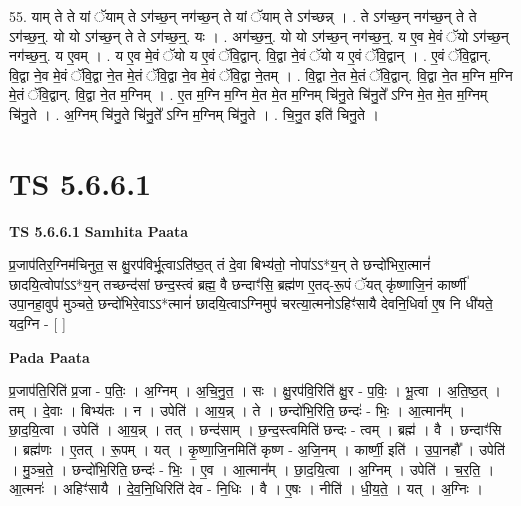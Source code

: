 \documentclass[17pt]{extarticle}
\begin{document}
55. याम् ते ते यां ॅयाम् ते ऽग॑च्छ॒न् नग॑च्छ॒न् ते यां ॅयाम् ते ऽग॑च्छन्न् । . ते ऽग॑च्छ॒न् नग॑च्छ॒न् ते ते ऽग॑च्छ॒न्॒. यो यो ऽग॑च्छ॒न् ते ते ऽग॑च्छ॒न्॒. यः । . अग॑च्छ॒न्॒. यो यो ऽग॑च्छ॒न् नग॑च्छ॒न्॒. य ए॒व मे॒वं ॅयो ऽग॑च्छ॒न् नग॑च्छ॒न्॒. य ए॒वम् । . य ए॒व मे॒वं ॅयो य ए॒वं ॅवि॒द्वान्. वि॒द्वा ने॒वं ॅयो य ए॒वं ॅवि॒द्वान् । . ए॒वं ॅवि॒द्वान्. वि॒द्वा ने॒व मे॒वं ॅवि॒द्वा ने॒त मे॒तं ॅवि॒द्वा ने॒व मे॒वं ॅवि॒द्वा ने॒तम् । . वि॒द्वा ने॒त मे॒तं ॅवि॒द्वान्. वि॒द्वा ने॒त म॒ग्नि म॒ग्नि मे॒तं ॅवि॒द्वान्. वि॒द्वा ने॒त म॒ग्निम् । . ए॒त म॒ग्नि म॒ग्नि मे॒त मे॒त म॒ग्निम् चि॑नु॒ते चि॑नु॒ते᳚ ऽग्नि मे॒त मे॒त म॒ग्निम् चि॑नु॒ते । . अ॒ग्निम् चि॑नु॒ते चि॑नु॒ते᳚ ऽग्नि म॒ग्निम् चि॑नु॒ते । . चि॒नु॒त इति॑ चिनु॒ते । \newline
\pagebreak
{}

\section{ TS 5.6.6.1 }

\textbf{TS 5.6.6.1 } \newline
\textbf{Samhita Paata} \newline

प्र॒जाप॑तिर॒ग्निम॑चिनुत॒ स क्षु॒रप॑विर्भू॒त्वाऽति॑ष्ठ॒त् तं दे॒वा बिभ्य॑तो॒ नोपा॑ऽऽ*य॒न् ते छन्दो॑भिरा॒त्मानं॑ छादयि॒त्वोपा॑ऽऽ*य॒न् तच्छन्द॑सां छन्द॒स्त्वं ब्रह्म॒ वै छन्दाꣳ॑सि॒ ब्रह्म॑ण ए॒तद्-रू॒पं ॅयत् कृ॑ष्णाजि॒नं कार्ष्णी॑ उपा॒नहा॒वुप॑ मुञ्चते॒ छन्दो॑भिरे॒वाऽऽ*त्मानं॑ छादयि॒त्वाऽग्निमुप॑ चरत्या॒त्मनोऽहिꣳ॑सायै देवनि॒धिर्वा ए॒ष नि धी॑यते॒ यद॒ग्नि - [  ] \newline

\textbf{Pada Paata} \newline

प्र॒जाप॑ति॒रिति॑ प्र॒जा - प॒तिः॒ । अ॒ग्निम् । अ॒चि॒नु॒त॒ । सः । क्षु॒रप॑वि॒रिति॑ क्षु॒र - प॒विः॒ । भू॒त्वा । अ॒ति॒ष्ठ॒त् । तम् । दे॒वाः । बिभ्य॑तः । न । उपेति॑ । आ॒य॒न्न् । ते । छन्दो॑भि॒रिति॒ छन्दः॑ - भिः॒ । आ॒त्मान᳚म् । छा॒द॒यि॒त्वा । उपेति॑ । आ॒य॒न्न् । तत् । छन्द॑साम् । छ॒न्द॒स्त्वमिति॑ छन्दः - त्वम् । ब्रह्म॑ । वै । छन्दाꣳ॑सि । ब्रह्म॑णः । ए॒तत् । रू॒पम् । यत् । कृ॒ष्णा॒जि॒नमिति॑ कृष्ण - अ॒जि॒नम् । कार्ष्णी॒ इति॑ । उ॒पा॒नहौ᳚ । उपेति॑ । मु॒ञ्च॒ते॒ । छन्दो॑भि॒रिति॒ छन्दः॑ - भिः॒ । ए॒व । आ॒त्मान᳚म् । छा॒द॒यि॒त्वा । अ॒ग्निम् । उपेति॑ । च॒र॒ति॒ । आ॒त्मनः॑ । अहिꣳ॑सायै । दे॒व॒नि॒धिरिति॑ देव - नि॒धिः । वै । ए॒षः । नीति॑ । धी॒य॒ते॒ । यत् । अ॒ग्निः ।  \newline
\end{document}
